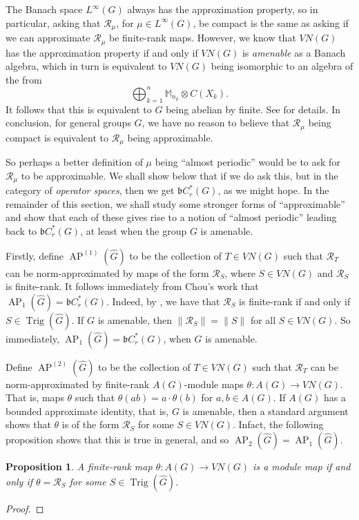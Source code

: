 \documentclass[twoside,a4paper]{article}
\newtheorem{proposition}[theorem]{Proposition}
\theoremstyle{definition}
\theoremstyle{remark}
\newcommand{\ap}{{\operatorname{AP}}}
\newcommand{\Trig}{{\operatorname{Trig}}}
\newcommand{\mc}{\mathcal}
\newcommand{\mf}{\mathfrak}
\begin{document}
The Banach space $L^\infty(G)$ always has the approximation property, so in particular,
asking that $\mc R_\mu$, for $\mu\in L^\infty(G)$, be compact is the same as asking if we can
approximate $\mc R_\mu$ be finite-rank maps.  However, we know that $VN(G)$ has the approximation
property if and only if $VN(G)$ is \emph{amenable} as a Banach algebra, which in turn is
equivalent to $VN(G)$ being isomorphic to an algebra of the from
\[ \bigoplus_{k=1}^n \mathbb M_{n_k} \otimes C(X_k). \]
It follows that this is equivalent to $G$ being abelian by finite.  See \cite[Section~6.1]{runde}
for details.  In conclusion, for general groups $G$, we have no reason to believe that
$\mc R_\mu$ being compact is equivalent to $\mc R_\mu$ being approximable.

So perhaps a better definition of $\mu$ being ``almost periodic'' would be to ask for
$\mc R_\mu$ to be approximable.  We shall show below that if we do ask this, but in the
category of \emph{operator spaces}, then we get $\mf b C^*_r(G)$, as we might hope.  In the 
remainder of this section, we shall study some stronger forms of ``approximable'' and show that
each of these gives rise to a notion of ``almost periodic'' leading back to $\mf b C^*_r(G)$,
at least when the group $G$ is amenable.

Firstly, define $\ap^{(1)}(\hat G)$ to be the collection of $T\in VN(G)$ such that $\mc R_T$ can
be norm-approximated by maps of the form $\mc R_S$, where $S\in VN(G)$ and $\mc R_S$ is
finite-rank.  It follows immediately from Chou's work that $\ap_1(\hat G)=\mf bC^*_r(G)$.
Indeed, by \cite[Proposition~2.3]{chou}, we have that $\mc R_S$ is finite-rank if and only if
$S\in\Trig(\hat G)$.  If $G$ is amenable, then $\|\mc R_S\| = \|S\|$ for all $S\in VN(G)$.
So immediately, $\ap_1(\hat G) = \mf b C^*_r(G)$, when $G$ is amenable.

Define $\ap^{(2)}(\hat G)$ to be the collection of $T\in VN(G)$ such that $\mc R_T$ can be
norm-approximated by finite-rank $A(G)$-module maps $\theta:A(G)\rightarrow VN(G)$.
That is, maps $\theta$ such that $\theta(ab) = a\cdot\theta(b)$ for $a,b\in A(G)$.  If $A(G)$
has a bounded approximate identity, that is, $G$ is amenable, then a standard argument shows
that $\theta$ is of the form $\mc R_S$ for some $S\in VN(G)$.  Infact, the following proposition
shows that this is true in general, and so $\ap_2(\hat G) = \ap_1(\hat G)$.

\begin{proposition}
A finite-rank map $\theta:A(G)\rightarrow VN(G)$ is a module map if and only if
$\theta=\mc R_S$ for some $S\in\Trig(\hat G)$.
\end{proposition}
\begin{proof}

\end{proof}
\end{document}
